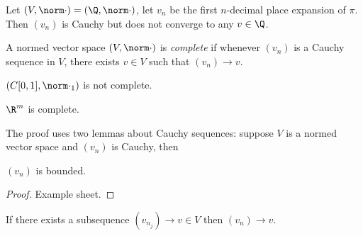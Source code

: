 \documentclass[a4paper]{article}
\theoremstyle{definition}
\begin{document}
\begin{center}
\end{center}

\begin{eg}
  Let \((V, \norm \cdot) = (\Q, \norm \cdot)\), let \(v_n\) be the first \(n\)-decimal place expansion of \(\pi\). Then \((v_n)\) is Cauchy but does not converge to any \(v\in \Q\).
\end{eg}

\begin{definition}[Completeness]
  A normed vector space \((V, \norm \cdot)\) is \emph{complete} if whenever \((v_n)\) is a Cauchy sequence in \(V\), there exists \(v\in V\) such that \((v_n) \to v\).
\end{definition}

\begin{eg}
  \((C[0, 1], \norm \cdot_1)\) is not complete.
\end{eg}

\begin{theorem}
  \label{thm:completeness of R}
  \(\R^m\) is complete.
\end{theorem}

The proof uses two lemmas about Cauchy sequences: suppose \(V\) is a normed vector space and \((v_n)\) is Cauchy, then

\begin{lemma}
  \label{lem:boundedness of Cauchy}
  \((v_n)\) is bounded.
\end{lemma}

\begin{proof}
  Example sheet.
\end{proof}

\begin{lemma}
  \label{lem:subsequence of Cauchy}
  If there exists a subsequence \((v_{n_j}) \to v \in V\) then \((v_n) \to v\).
\end{lemma}
\end{document}
